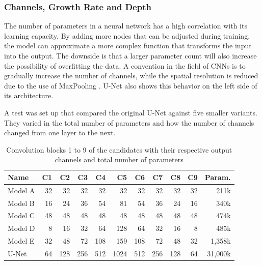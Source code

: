 \subsubsection{Channels, Growth Rate and Depth}

The number of parameters in a neural network has a high correlation with its learning capacity. By adding more nodes that can be adjusted during training, the model can approximate a more complex function that transforms the input into the output. The downside is that a larger parameter count will also increase the possibility of overfitting the data. A convention in the field of CNNs is to gradually increase the number of channels, while the spatial resolution is reduced due to the use of MaxPooling \cite{Krizhevsky}\cite{He2015b}\cite{Iandola2016a}\cite{Ronneberger2015a}. U-Net also shows this behavior on the left side of its architecture.

A test was set up that compared the original U-Net against five smaller variants. They varied in the total number of parameters and how the number of channels changed from one layer to the next.

\begin{table}[H]
    \centering
    \begin{tabular}{| l || r | r | r | r | r | r | r | r | r || r |}
    \hline
    Name    & C1   & C2   & C3   & C4   & C5   & C6   & C7   & C8   & C9  & Param. \\ 
    \hline
    \hline
    Model A &   32 &   32 &   32 &   32 &   32 &   32 &   32 &   32 &  32 & 211k      \\
    \hline
    Model B &   16 &   24 &   36 &   54 &   81 &   54 &   36 &   24 &  16 & 340k      \\
    \hline
    Model C &   48 &   48 &   48 &   48 &   48 &   48 &   48 &   48 &  48 & 474k      \\
    \hline
    Model D &    8 &   16 &   32 &   64 &  128 &   64 &   32 &   16 &   8 & 485k      \\
    \hline
    Model E &   32 &   48 &   72 &  108 &  159 &  108 &   72 &   48 &  32 & 1,358k      \\
    \hline
    U-Net   &   64 &  128 &  256 &  512 & 1024 &  512 &  256 &  128 &  64 & 31,000k      \\
    \hline
    \end{tabular}
    \caption{Convolution blocks 1 to 9 of the candidates with their respective output channels and total number of parameters}
\end{table}

